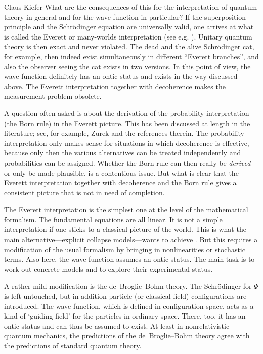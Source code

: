 \begin{artengenv}{Claus Kiefer}
What are the consequences of this for the interpretation of quantum
theory in general and for the wave function in particular?
If the superposition principle and the Schr\"odinger equation are
universally valid, one arrives at what is called the Everett or
many-worlds interpretation (see e.g. \cite{despagnat_veiled_1995,zeh_strange_2016}).
Unitary
quantum theory is then exact and never violated. The dead and the
alive Schr\"odinger cat, for example, then indeed exist simultaneously
in different ``Everett branches'', and also the observer seeing the
cat exists in two versions. In this point of view, the wave function
definitely has an ontic status and exists in the way discussed above.
The Everett interpretation together with decoherence makes the
measurement problem obsolete.

A question often asked is about the derivation of the probability
interpretation (the Born rule) in the Everett picture. This has been
discussed at length in the literature; see, for example, Zurek
\parencite*{zurek_wojciech_hubert_quantum_2018}
and the references therein. The probability interpretation only makes
sense for situations in which decoherence is effective, because only
then the various alternatives can be treated independently and probabilities can be
assigned. Whether the Born rule can then really be {\em
  derived} or only be made plausible, is a contentious issue. But what is
clear that the Everett interpretation together with decoherence and
the Born rule gives a consistent picture that is not in need
of completion. 

The Everett interpretation is the simplest one at the level of the
mathematical formalism. The fundamental equations are all linear. It
is not a simple interpretation if one sticks to a classical picture of
the world. This is what the main alternative---explicit collapse
models---wants to achieve \parencite[see e.g.][]{bassi_models_2013}. But this
requires a modification of the usual formalism by bringing in
nonlinearities or stochastic terms. Also here, the wave function
assumes an ontic status. The main task is to work out concrete models
and to explore their experimental status. 

A rather mild modification is the de~Broglie--Bohm
theory. The Schr\"odinger for $\Psi$ is left untouched, but
in addition particle (or classical field) configurations are
introduced. The wave function, which is defined in configuration space,
acts as a kind of `guiding field' for the particles in ordinary
space. There, too, it has an ontic status and can thus be assumed to
exist. At least in nonrelativistic quantum mechanics, the predictions
of the  de~Broglie--Bohm theory agree with the predictions of standard quantum
theory.


\end{artengenv}
